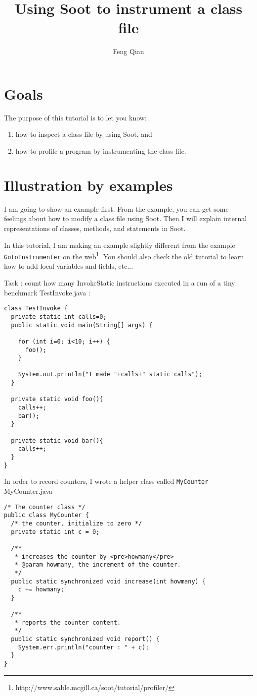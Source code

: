 \documentclass[12pt]{article}
\title{Using Soot to instrument a class file}
\author{Feng Qian}
\begin{document}
\maketitle

\section{Goals}
The purpose of this tutorial is to let you know:
\begin{enumerate}
\item how to inspect a class file by using Soot, and
\item how to profile a program by instrumenting the class file.
\end{enumerate}

\section{Illustration by examples}
I am going to show an example first. From the example, you can 
get some feelings about how to modify a class file using Soot.
Then I will explain internal representations of classes,
methods, and statements in Soot.

In this tutorial, I am making an example slightly different from the
example {\tt GotoInstrumenter} on the
web\footnote{http://www.sable.mcgill.ca/soot/tutorial/profiler/}.  You
should also check the old tutorial to learn how to add local variables
and fields, etc...

\vspace{.2in}
\noindent
{\Large Task :} count how many InvokeStatic instructions executed in a run of
a tiny benchmark {\Large TestInvoke.java :}
\begin{verbatim}
class TestInvoke {
  private static int calls=0;
  public static void main(String[] args) {
 
    for (int i=0; i<10; i++) {
      foo();
    }
 
    System.out.println("I made "+calls+" static calls");
  }
 
  private static void foo(){
    calls++;
    bar();
  }
 
  private static void bar(){
    calls++;
  }
}
\end{verbatim} 

\noindent
In order to record counters, I wrote a helper class called {\tt MyCounter}
{\Large MyCounter.java}
\begin{verbatim}
/* The counter class */
public class MyCounter {
  /* the counter, initialize to zero */
  private static int c = 0;
 
  /**
   * increases the counter by <pre>howmany</pre>
   * @param howmany, the increment of the counter.
   */
  public static synchronized void increase(int howmany) {
    c += howmany;
  }
 
  /**
   * reports the counter content.
   */
  public static synchronized void report() {
    System.err.println("counter : " + c);
  }
}
\end{verbatim}
\end{document}
